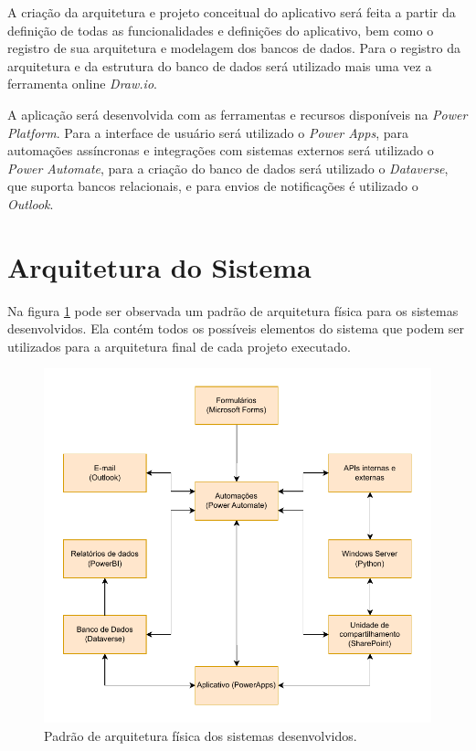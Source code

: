 	A criação da arquitetura e projeto conceitual do aplicativo será feita a partir da definição de todas as funcionalidades e definições do aplicativo, bem como o registro de sua arquitetura e modelagem dos bancos de dados. Para o registro da arquitetura e da estrutura do banco de dados será utilizado mais uma vez a ferramenta online \textit{Draw.io}.

	A aplicação será desenvolvida com as ferramentas e recursos disponíveis na \textit{Power Platform}. Para a interface de usuário será utilizado o \textit{Power Apps}, para automações assíncronas e integrações com sistemas externos será utilizado o \textit{Power Automate}, para a criação do banco de dados será utilizado o \textit{Dataverse}, que suporta bancos relacionais, e para envios de notificações é utilizado o \textit{Outlook}.

	\section{Arquitetura do Sistema}

	Na figura \ref{fig:metodologia:arquiteturaFisica} pode ser observada um padrão de arquitetura física para os sistemas desenvolvidos. Ela contém todos os possíveis
	elementos do sistema que podem ser utilizados para a arquitetura final de cada projeto executado. 
	\begin{figure}[h]
		\centering
		\includegraphics[width=1\textwidth]{./figuras/arquiteturaFisica.pdf}
		\caption{Padrão de arquitetura física dos sistemas desenvolvidos.}
		\label{fig:metodologia:arquiteturaFisica}
	\end{figure}

